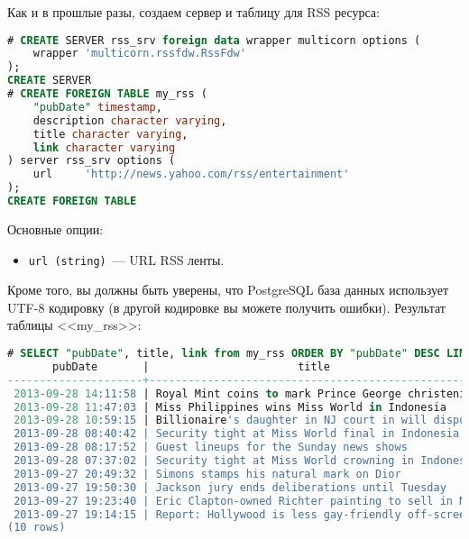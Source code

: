 Как и в прошлые разы, создаем сервер и таблицу для RSS ресурса:

\begin{lstlisting}[language=SQL,label=lst:pgmulticorn-rss2,caption=Multicorn]
# CREATE SERVER rss_srv foreign data wrapper multicorn options (
    wrapper 'multicorn.rssfdw.RssFdw'
);
CREATE SERVER
# CREATE FOREIGN TABLE my_rss (
    "pubDate" timestamp,
    description character varying,
    title character varying,
    link character varying
) server rss_srv options (
    url     'http://news.yahoo.com/rss/entertainment'
);
CREATE FOREIGN TABLE
\end{lstlisting}

Основные опции:

\begin{itemize}
  \item \lstinline!url (string)!~--- URL RSS ленты.
\end{itemize}

Кроме того, вы должны быть уверены, что PostgreSQL база данных использует UTF-8 кодировку (в другой кодировке вы можете получить ошибки). Результат таблицы <<my\_rss>>:

\begin{lstlisting}[language=SQL,label=lst:pgmulticorn-rss3,caption=Multicorn]
# SELECT "pubDate", title, link from my_rss ORDER BY "pubDate" DESC LIMIT 10;
       pubDate       |                       title                        |                                         link
---------------------+----------------------------------------------------+--------------------------------------------------------------------------------------
 2013-09-28 14:11:58 | Royal Mint coins to mark Prince George christening | http://news.yahoo.com/royal-mint-coins-mark-prince-george-christening-115906242.html
 2013-09-28 11:47:03 | Miss Philippines wins Miss World in Indonesia      | http://news.yahoo.com/miss-philippines-wins-miss-world-indonesia-144544381.html
 2013-09-28 10:59:15 | Billionaire's daughter in NJ court in will dispute | http://news.yahoo.com/billionaires-daughter-nj-court-dispute-144432331.html
 2013-09-28 08:40:42 | Security tight at Miss World final in Indonesia    | http://news.yahoo.com/security-tight-miss-world-final-indonesia-123714041.html
 2013-09-28 08:17:52 | Guest lineups for the Sunday news shows            | http://news.yahoo.com/guest-lineups-sunday-news-shows-183815643.html
 2013-09-28 07:37:02 | Security tight at Miss World crowning in Indonesia | http://news.yahoo.com/security-tight-miss-world-crowning-indonesia-113634310.html
 2013-09-27 20:49:32 | Simons stamps his natural mark on Dior             | http://news.yahoo.com/simons-stamps-natural-mark-dior-223848528.html
 2013-09-27 19:50:30 | Jackson jury ends deliberations until Tuesday      | http://news.yahoo.com/jackson-jury-ends-deliberations-until-tuesday-235030969.html
 2013-09-27 19:23:40 | Eric Clapton-owned Richter painting to sell in NYC | http://news.yahoo.com/eric-clapton-owned-richter-painting-sell-nyc-201447252.html
 2013-09-27 19:14:15 | Report: Hollywood is less gay-friendly off-screen  | http://news.yahoo.com/report-hollywood-less-gay-friendly-off-screen-231415235.html
(10 rows)
\end{lstlisting}


